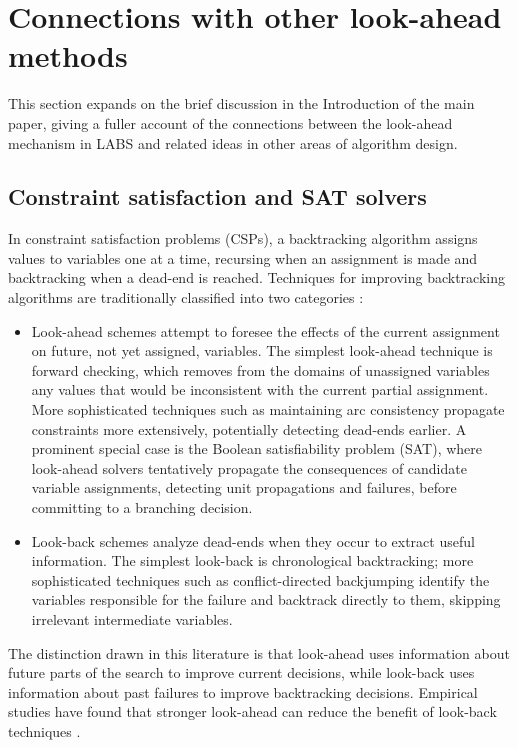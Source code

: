 \documentclass[12pt, a4paper]{article}
\begin{document}
\section{Connections with other look-ahead methods}
\label{sup:lookahead}

This section expands on the brief discussion in the Introduction of the main paper, giving a fuller account of the connections between the look-ahead mechanism in LABS and related ideas in other areas of algorithm design.

\subsection{Constraint satisfaction and SAT solvers}

In constraint satisfaction problems (CSPs), a backtracking algorithm assigns values to variables one at a time, recursing when an assignment is made and backtracking when a dead-end is reached. Techniques for improving backtracking algorithms are traditionally classified into two categories \citep{kondrak1997, dechter2003}:

\begin{itemize}
    \item Look-ahead schemes attempt to foresee the effects of the current assignment on future, not yet assigned, variables. The simplest look-ahead technique is forward checking, which removes from the domains of unassigned variables any values that would be inconsistent with the current partial assignment. More sophisticated techniques such as maintaining arc consistency propagate constraints more extensively, potentially detecting dead-ends earlier. A prominent special case is the Boolean satisfiability problem (SAT), where look-ahead solvers \citep{hvm09} tentatively propagate the consequences of candidate variable assignments, detecting unit propagations and failures, before committing to a branching decision.

    \item Look-back schemes analyze dead-ends when they occur to extract useful information. The simplest look-back is chronological backtracking; more sophisticated techniques such as conflict-directed backjumping identify the variables responsible for the failure and backtrack directly to them, skipping irrelevant intermediate variables.
\end{itemize}

The distinction drawn in this literature is that look-ahead uses information about future parts of the search to improve current decisions, while look-back uses information about past failures to improve backtracking decisions. Empirical studies have found that stronger look-ahead can reduce the benefit of look-back techniques \citep{kondrak1997}.
\end{document}
